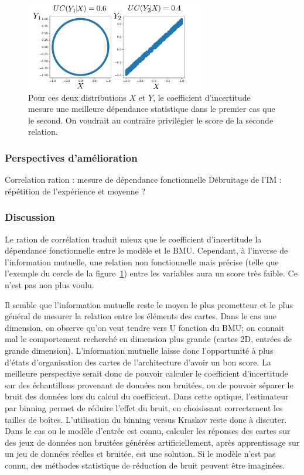 \begin{figure}
\centering
\includegraphics[width=0.7\textwidth]{exemple_limite.pdf}
\caption{Pour ces deux distributions $X$ et $Y$, le coefficient d'incertitude mesure une meilleure dépendance statistique dans le premier cas que le second. On voudrait au contraire privilégier le score de la seconde relation.}
\label{fig:exemple-limite}
\end{figure}

\subsubsection{Perspectives d'amélioration}
Correlation ration : mesure de dépendance fonctionnelle
Débruitage de l'IM : répétition de l'expérience et moyenne ? 

\subsubsection{Discussion}

Le ration de corrélation traduit mieux que le coefficient d'incertitude la dépendance fonctionnelle entre le modèle et le BMU. Cependant, à l'inverse de l'information mutuelle, une relation non fonctionnelle mais précise (telle que l'exemple du cercle de la figure~\ref{fig:exemple-limite}) entre les variables aura un score très faible. Ce n'est pas non plus voulu. 

Il semble que l'information mutuelle reste le moyen le plus prometteur et le plus général de mesurer la relation entre les éléments des cartes. Dans le cas une dimension, on observe qu'on veut tendre vers U fonction du BMU; on connait mal le comportement recherché en dimension plus grande (cartes 2D, entrées de grande dimension). L'information mutuelle laisse donc l'opportunité à plus d'états d'organisation des cartes de l'architecture d'avoir un bon score. La meilleure perspective serait donc de pouvoir calculer le coefficient d'incertitude sur des échantillons provenant de données non bruitées, ou de pouvoir séparer le bruit des données lors du calcul du coefficient.
Dans cette optique, l'estimateur par binning permet de réduire l'effet du bruit, en choisissant correctement les tailles de boîtes. L'utilisation du binning versus Kraskov reste donc à discuter.
Dans le cas ou le modèle d'entrée est connu, calculer les réponses des cartes sur des jeux de données non bruitées générées artificiellement, après apprentissage sur un jeu de données réelles et bruitée, est une solution. Si le modèle n'est pas connu, des méthodes statistique de réduction de bruit peuvent être imaginées. 

